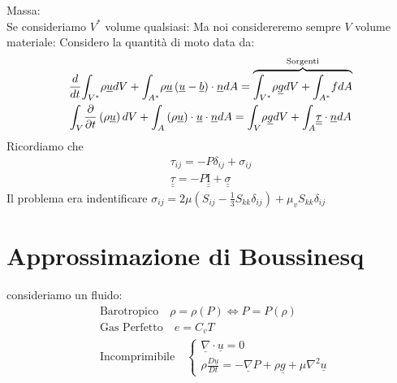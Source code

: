Massa:\\
Se consideriamo $ V^* $ volume qualsiasi:
\twomini{
  \[
    \frac{d}{dt}\displaystyle{\int_{V^*}^{}}\rho dV = \displaystyle{\int_{A^*}^{}}\left( \underline{b}-\underline{u}\right) \cdot \underline{n}dA
  \]
}{
  \[
    \pdev{\rho }{t}+\underline{\nabla}\cdot \left( \rho \cdot \underline{u}\right) =0
  \]

}
Ma noi considereremo sempre $ V $ volume materiale:
Considero la quantità di moto data da:
\begin{gather*}
  \frac{d}{dt}\displaystyle{\int_{V^*}^{}}\rho \underline{u}dV+\displaystyle{\int_{A^*}^{}}\rho \underline{u}\left( \underline{u}-\underline{b}\right) \cdot \underline{n}dA = \overbrace{{\displaystyle{\int_{V^*}^{}}\rho \underline{g}dV + \displaystyle{\int_{A^*}^{}}fdA}}^{\text{Sorgenti}}\\
  \displaystyle{\int_{V}^{}}\frac{\partial}{\partial t}\left( \rho \underline{u}\right) dV + \displaystyle{\int_{A}^{}}\left( \rho \underline{u}\right) \cdot \underline{u}\cdot \underline{n} dA = \displaystyle{\int_{V}^{}}\rho \underline{g}dV + \displaystyle{\int_{A}^{}} \underline{\underline{\tau}}\cdot \underline{n}dA
\end{gather*}
Ricordiamo che
\begin{gather*}
  \tau_{ij}= -P \delta_{ij} +\sigma_{ij}\\
  \underline{\underline{\tau}} = -P \underline{\underline{\mathrm{I}}} + \underline{\underline{\sigma}}
\end{gather*}
Il problema era indentificare $ \sigma_{ij} =2\mu \left( S_{ij}-\frac{1}{3}S_{kk}\delta_{ij} \right) +\mu_v S_{kk}\delta_{ij}  $

\section{Approssimazione di Boussinesq}
consideriamo un fluido:
\begin{align*}
  &\text{Barotropico} \quad \rho =\rho \left( P\right) \iff P = P\left( \rho \right) \\
  &\text{Gas Perfetto} \quad e= C_vT \\
  &\text{Incomprimibile} \quad \begin{cases}
    \underline{\nabla}\cdot \underline{u}=0\\
    \rho \frac{D \underline{u}}{Dt}=-\underline{\nabla}P+\rho \underline{g}+\mu \nabla^2 \underline{u}
  \end{cases} 
\end{align*}
